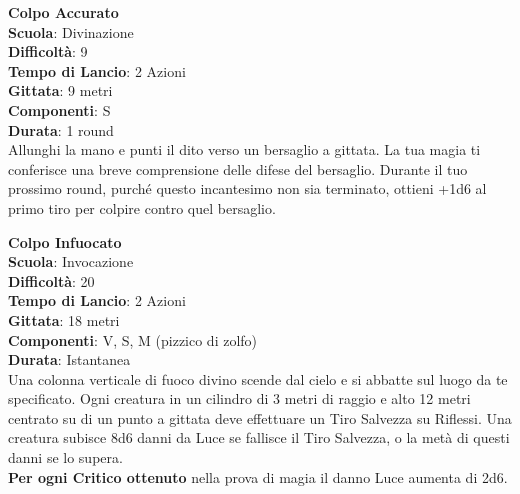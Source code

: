 \begin{multicols}{2}
\medskip\textbf{Colpo Accurato}\\
\textbf{Scuola}: Divinazione\\
\textbf{Difficoltà}:  9\\
\textbf{Tempo di Lancio}: 2 Azioni\\
\textbf{Gittata}: 9 metri\\
\textbf{Componenti}: S\\
\textbf{Durata}: 1 round\\
Allunghi la mano e punti il dito verso un bersaglio a gittata. La tua magia ti conferisce una breve comprensione delle difese del bersaglio. Durante il tuo prossimo round, purché questo incantesimo non sia terminato, ottieni +1d6 al primo tiro per colpire contro quel bersaglio.

\medskip\textbf{Colpo Infuocato}\\
\textbf{Scuola}: Invocazione\\
\textbf{Difficoltà}:  20\\
\textbf{Tempo di Lancio}: 2 Azioni\\
\textbf{Gittata}: 18 metri\\
\textbf{Componenti}: V, S, M (pizzico di zolfo)\\
\textbf{Durata}: Istantanea\\
Una colonna verticale di fuoco divino scende dal cielo e si abbatte sul luogo da te specificato. Ogni creatura in un cilindro di 3 metri di raggio e alto 12 metri centrato su di un punto a gittata deve effettuare un Tiro Salvezza su Riflessi. Una creatura subisce 8d6 danni da Luce se fallisce il Tiro Salvezza, o la metà di questi danni se lo supera.\\
\textbf{Per ogni Critico ottenuto} nella prova di magia il danno Luce aumenta di 2d6.


\end{multicols}
